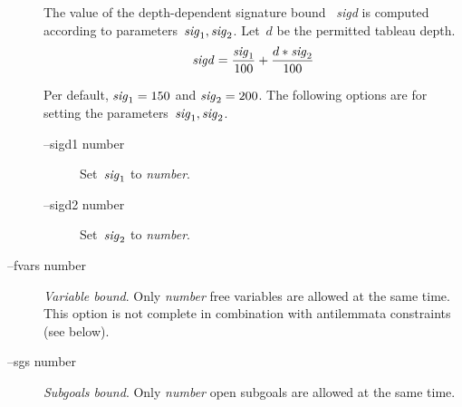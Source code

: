 \begin{description}
           The value of the depth-dependent signature bound~{\it
           sigd\/} is computed according to parameters~$\mbox{{\it
           sig\/}}_1, \mbox{{\it sig\/}}_2$.  Let~$d$ be the permitted
           tableau depth. 
           \[
               \mbox{{\it sigd\/}} = 
               \frac{\mbox{{\it sig\/}}_1}
                    {100} +
               \frac{d * \mbox{{\it sig\/}}_2}
                    {100}
           \] 

           Per default, $\mbox{{\it sig\/}}_1 = 150$ and 
           $\mbox{{\it sig\/}}_2 = 200$.
           The following options are for setting the
           parameters~$\mbox{{\it sig\/}}_1, \mbox{{\it sig\/}}_2$.   
           \begin{description}
           \item [--sigd1 number] 
                 Set~$\mbox{{\it sig\/}}_1$ to {\it number\/}. 
           \item [--sigd2 number] 
                 Set~$\mbox{{\it sig\/}}_2$ to {\it number\/}. 
           \end{description}
      \item[--fvars number]
           {\em Variable bound\/}. Only {\it number\/} free variables
           are allowed at the same 
           time. This option is not complete in combination with
           antilemmata constraints (see below).
      \item[--sgs number]
           {\em Subgoals bound\/}. Only {\it number\/} open subgoals
           are allowed at the same time. 
\end{description}

